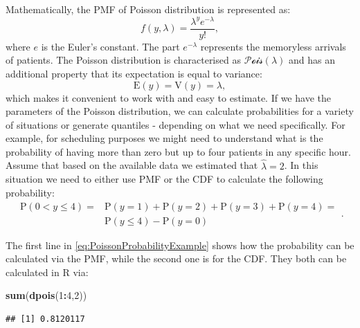\documentclass[
]{book}
\newenvironment{Shaded}{\begin{snugshade}}{\end{snugshade}}
\newcommand{\DecValTok}[1]{\textcolor[rgb]{0.00,0.00,0.81}{#1}}
\newcommand{\KeywordTok}[1]{\textcolor[rgb]{0.13,0.29,0.53}{\textbf{#1}}}
\newcommand{\NormalTok}[1]{#1}
\newcommand{\OperatorTok}[1]{\textcolor[rgb]{0.81,0.36,0.00}{\textbf{#1}}}
\theoremstyle{definition}
\theoremstyle{definition}
\theoremstyle{definition}
\theoremstyle{definition}
\theoremstyle{remark}
\begin{document}
Mathematically, the PMF of Poisson distribution is represented as:
\begin{equation}
    f(y, \lambda) = \frac{\lambda^y e^{-\lambda}}{y!} ,
    \label{eq:PoissonPMF}
\end{equation}
where \(e\) is the Euler's constant. The part \(e^{-\lambda}\) represents the memoryless arrivals of patients. The Poisson distribution is characterised as \(\mathcal{Pois}(\lambda)\) and has an additional property that its expectation is equal to variance:
\begin{equation}
    \mathrm{E}(y) = \mathrm{V}(y) = \lambda ,
    \label{eq:PoissonMean}
\end{equation}
which makes it convenient to work with and easy to estimate. If we have the parameters of the Poisson distribution, we can calculate probabilities for a variety of situations or generate quantiles - depending on what we need specifically. For example, for scheduling purposes we might need to understand what is the probability of having more than zero but up to four patients in any specific hour. Assume that based on the available data we estimated that \(\hat{\lambda}=2\). In this situation we need to either use PMF or the CDF to calculate the following probability:
\begin{equation}
    \begin{aligned}
        \mathrm{P}(0 < y \leq 4) = & \mathrm{P}(y=1) + \mathrm{P}(y=2) + \mathrm{P}(y=3) + \mathrm{P}(y=4) = \\
                                   & \mathrm{P}(y \leq 4) - \mathrm{P}(y=0)
    \end{aligned} .
    \label{eq:PoissonProbabilityExample}
\end{equation}

The first line in \eqref{eq:PoissonProbabilityExample} shows how the probability can be calculated via the PMF, while the second one is for the CDF. They both can be calculated in R via:

\begin{Shaded}
\begin{Highlighting}[]
\KeywordTok{sum}\NormalTok{(}\KeywordTok{dpois}\NormalTok{(}\DecValTok{1}\OperatorTok{:}\DecValTok{4}\NormalTok{,}\DecValTok{2}\NormalTok{))}
\end{Highlighting}
\end{Shaded}

\begin{verbatim}
## [1] 0.8120117
\end{verbatim}
\end{document}
